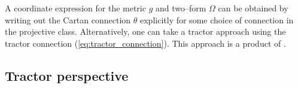 
\begin{rmk}
A coordinate expression for the metric $g$ and two--form $\Omega$ can be obtained by writing out the Cartan connection $\theta$ explicitly for some choice of connection in the projective class. Alternatively, one can take a tractor approach using the tractor connection (\ref{eq:tractor_connection}). This approach is a product of \cite{DGW}.
\end{rmk}

\subsection{Tractor perspective} \label{sec:trac_construction}

